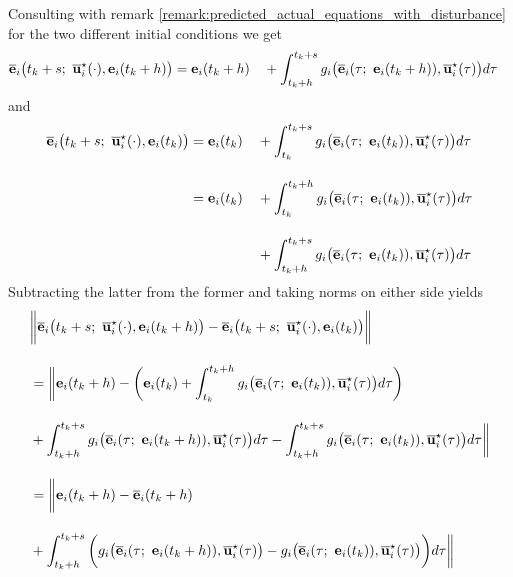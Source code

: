 \begin{gg_box}
Consulting with remark \eqref{remark:predicted_actual_equations_with_disturbance}
for the two different initial conditions we get
\begin{alignat}{2}
  \overline{\vect{e}}_i\big(t_k + s;\ \overline{\vect{u}}_i^{\star}(\cdot), \vect{e}_i(t_k +h)\big)
    &= \vect{e}_i(t_k +h)
    &&+ \int_{t_k +h}^{t_k + s} g_i\big(\overline{\vect{e}}_i(\tau;\ \vect{e}_i(t_k + h)), \overline{\vect{u}}_i^{\star}(\tau)\big) d\tau
\end{alignat}
and
\begin{alignat}{2}
  \overline{\vect{e}}_i\big(t_k + s;\ \overline{\vect{u}}_i^{\star}(\cdot), \vect{e}_i(t_k)\big)
    &= \vect{e}_i(t_k)
    &&+ \int_{t_k}^{t_k + s} g_i\big(\overline{\vect{e}}_i(\tau;\ \vect{e}_i(t_k)), \overline{\vect{u}}_i^{\star}(\tau)\big) d\tau \\[2.5ex]
  &= \vect{e}_i(t_k)
    &&+ \int_{t_k}^{t_k + h} g_i\big(\overline{\vect{e}}_i(\tau;\ \vect{e}_i(t_k)), \overline{\vect{u}}_i^{\star}(\tau)\big) d\tau \\[2.5ex]
  & &&+ \int_{t_k + h}^{t_k + s} g_i\big(\overline{\vect{e}}_i(\tau;\ \vect{e}_i(t_k)), \overline{\vect{u}}_i^{\star}(\tau)\big) d\tau
\end{alignat}
Subtracting the latter from the former and taking norms on either side yields
\begin{align}
  &\bigg \| \overline{\vect{e}}_i\big(t_k + s;\ \overline{\vect{u}}_i^{\star}(\cdot), \vect{e}_i(t_k +h)\big)
    -\overline{\vect{e}}_i\big(t_k + s;\ \overline{\vect{u}}_i^{\star}(\cdot), \vect{e}_i(t_k)\big) \bigg \| \\[2.5ex]
    &= \bigg\| \vect{e}_i(t_k +h)
 - \bigg( \vect{e}_i(t_k) + \int_{t_k}^{t_k + h} g_i\big(\overline{\vect{e}}_i(\tau;\ \vect{e}_i(t_k)), \overline{\vect{u}}_i^{\star}(\tau)\big) d\tau \bigg) \\[2.5ex]
 &+ \int_{t_k +h}^{t_k + s} g_i\big(\overline{\vect{e}}_i(\tau;\ \vect{e}_i(t_k + h)), \overline{\vect{u}}_i^{\star}(\tau)\big) d\tau
    - \int_{t_k + h}^{t_k + s} g_i\big(\overline{\vect{e}}_i(\tau;\ \vect{e}_i(t_k)), \overline{\vect{u}}_i^{\star}(\tau)\big) d\tau \bigg\| \\[2.5ex]
    &= \bigg\| \vect{e}_i(t_k +h) - \overline{\vect{e}}_i(t_k + h) \\[2.5ex]
    &+ \int_{t_k +h}^{t_k + s} \bigg( g_i\big(\overline{\vect{e}}_i(\tau;\ \vect{e}_i(t_k + h)), \overline{\vect{u}}_i^{\star}(\tau)\big)
    -  g_i\big(\overline{\vect{e}}_i(\tau;\ \vect{e}_i(t_k)), \overline{\vect{u}}_i^{\star}(\tau)\big) \bigg) d\tau \bigg\| \\[2.5ex]

\end{align}
\end{gg_box}
